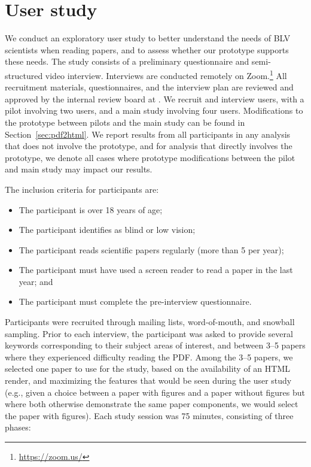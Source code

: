 \section{User study}
\label{sec:user_study}

We conduct an exploratory user study to better understand the needs of BLV scientists when reading papers, and to assess whether our prototype supports these needs. The study consists of a preliminary questionnaire and semi-structured video interview. Interviews are conducted remotely on Zoom.\footnote{\href{https://zoom.us/}{https://zoom.us/}} All recruitment materials, questionnaires, and the interview plan are reviewed and approved by the internal review board at \allenai. We recruit and interview \numusers users, with a pilot involving two users, and a main study involving four users. Modifications to the prototype between pilots and the main study can be found in Section~\ref{sec:pdf2html}. We report results from all \numusers participants in any analysis that does not involve the prototype, and for analysis that directly involves the prototype, we denote all cases where prototype modifications between the pilot and main study may impact our results.

The inclusion criteria for participants are:

\begin{itemize}
    \item The participant is over 18 years of age;
    \item The participant identifies as blind or low vision;
    \item The participant reads scientific papers regularly (more than 5 per year);
    \item The participant must have used a screen reader to read a paper in the last year; and
    \item The participant must complete the pre-interview questionnaire.
\end{itemize}

Participants were
recruited through mailing lists, word-of-mouth, and snowball sampling. Prior to each interview, the participant was asked to provide several keywords corresponding to their subject areas of interest, and between 3--5 papers where they experienced difficulty reading the PDF. Among the 3--5 papers, we selected one paper to use for the study, based on the availability of an HTML render, and maximizing the features that would be seen during the user study (e.g., given a choice between a paper with figures and a paper without figures but where both otherwise demonstrate the same paper components, we would select the paper with figures). Each study session was 75 minutes, consisting of three phases:

